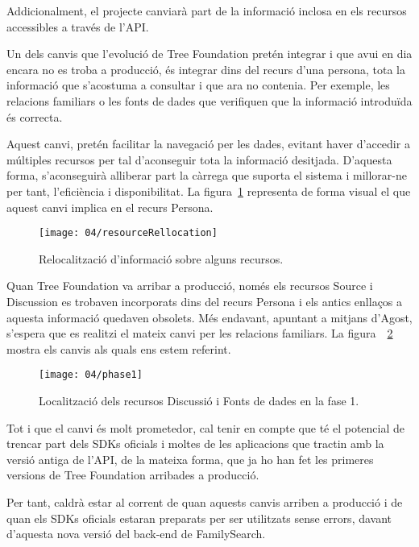     Addicionalment, el projecte canviarà part de la informació inclosa en els recursos accessibles a través de l'API.

    Un dels canvis que l’evolució de Tree Foundation pretén integrar i que avui en dia encara no es troba a producció, és integrar dins del recurs d’una persona, tota la informació que s’acostuma a consultar i que ara no contenia. Per exemple, les relacions familiars o les fonts de dades que verifiquen que la informació introduïda és correcta.

    Aquest canvi, pretén facilitar la navegació per les dades, evitant haver d’accedir a múltiples recursos per tal d’aconseguir tota la informació desitjada. D'aquesta forma, s'aconseguirà alliberar part la càrrega que suporta el sistema i millorar-ne per tant, l'eficiència i disponibilitat. La figura~\ref{ref:resources} representa de forma visual el que aquest canvi implica en el recurs Persona.

    \begin{figure}[h]
        \texttt{[image: 04/resourceRellocation]}
        \centering
        \caption{Relocalització d'informació sobre alguns recursos.\label{ref:resources}}
    \end{figure}

    Quan Tree Foundation va arribar a producció, només els recursos Source i Discussion es trobaven incorporats dins del recurs Persona i els antics enllaços a aquesta informació quedaven obsolets. Més endavant, apuntant a mitjans d’Agost, s'espera que es realitzi el mateix canvi per les relacions familiars. La figura~~\ref{ref:phase1} mostra els canvis als quals ens estem referint.

    \begin{figure}[h]
        \texttt{[image: 04/phase1]}
        \centering
        \caption{Localització dels recursos Discussió i Fonts de dades en la fase 1.\label{ref:phase1}}
    \end{figure}

    Tot i que el canvi és molt prometedor, cal tenir en compte que té el potencial de trencar part dels SDKs oficials i moltes de les aplicacions que tractin amb la versió antiga de l'API, de la mateixa forma, que ja ho han fet les primeres versions de Tree Foundation arribades a producció.

    Per tant, caldrà estar al corrent de quan aquests canvis arriben a producció i de quan els SDKs oficials estaran preparats per ser utilitzats sense errors, davant d'aquesta nova versió del back-end de FamilySearch.
